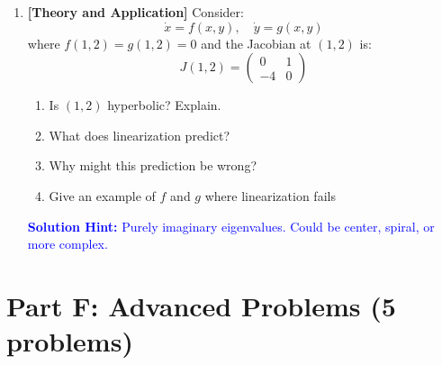 \documentclass[12pt]{article}
\newcommand{\solution}[1]{\textcolor{blue}{\textbf{Solution Hint:} #1}}
\begin{document}
\begin{enumerate}[resume]
\item \textbf{[Theory and Application]} Consider:
$$\dot{x} = f(x,y), \quad \dot{y} = g(x,y)$$
where $f(1,2) = g(1,2) = 0$ and the Jacobian at $(1,2)$ is:
$$J(1,2) = \begin{pmatrix} 0 & 1 \\ -4 & 0 \end{pmatrix}$$
\begin{enumerate}[label=(\alph*)]
    \item Is $(1,2)$ hyperbolic? Explain.
    \item What does linearization predict?
    \item Why might this prediction be wrong?
    \item Give an example of $f$ and $g$ where linearization fails
\end{enumerate}
\solution{Purely imaginary eigenvalues. Could be center, spiral, or more complex.}
\end{enumerate}

\section*{Part F: Advanced Problems (5 problems)}
\end{document}
